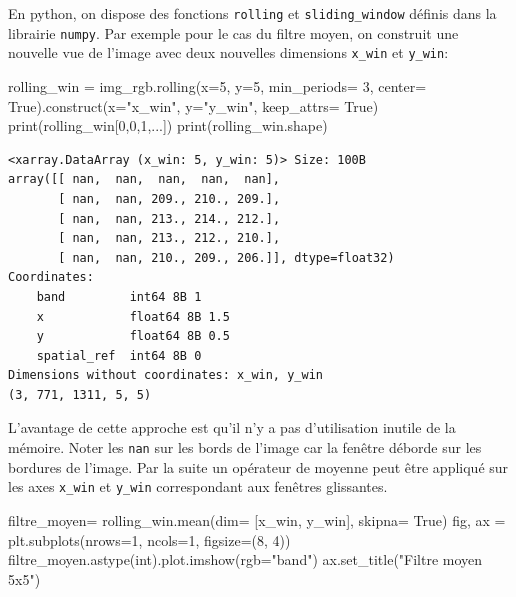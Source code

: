 \documentclass[
  french,
  11pt,
  letterpaper,
  open=any,
  twoside=false,
  french]{scrbook}
\newenvironment{Shaded}{\begin{snugshade}}{\end{snugshade}}
\newcommand{\BuiltInTok}[1]{\textcolor[rgb]{0.00,0.23,0.31}{#1}}
\newcommand{\DecValTok}[1]{\textcolor[rgb]{0.68,0.00,0.00}{#1}}
\newcommand{\NormalTok}[1]{\textcolor[rgb]{0.00,0.23,0.31}{#1}}
\newcommand{\OperatorTok}[1]{\textcolor[rgb]{0.37,0.37,0.37}{#1}}
\newcommand{\StringTok}[1]{\textcolor[rgb]{0.13,0.47,0.30}{#1}}
\newcommand{\VariableTok}[1]{\textcolor[rgb]{0.07,0.07,0.07}{#1}}
\begin{document}
En python, on dispose des fonctions \texttt{rolling} et
\texttt{sliding\_window} définis dans la librairie \texttt{numpy}. Par
exemple pour le cas du filtre moyen, on construit une nouvelle vue de
l'image avec deux nouvelles dimensions \texttt{x\_win} et
\texttt{y\_win}:

\begin{Shaded}
\begin{Highlighting}[]
\NormalTok{rolling\_win }\OperatorTok{=}\NormalTok{ img\_rgb.rolling(x}\OperatorTok{=}\DecValTok{5}\NormalTok{, y}\OperatorTok{=}\DecValTok{5}\NormalTok{,  min\_periods}\OperatorTok{=} \DecValTok{3}\NormalTok{, center}\OperatorTok{=} \VariableTok{True}\NormalTok{).construct(x}\OperatorTok{=}\StringTok{"x\_win"}\NormalTok{, y}\OperatorTok{=}\StringTok{"y\_win"}\NormalTok{, keep\_attrs}\OperatorTok{=} \VariableTok{True}\NormalTok{)}
\BuiltInTok{print}\NormalTok{(rolling\_win[}\DecValTok{0}\NormalTok{,}\DecValTok{0}\NormalTok{,}\DecValTok{1}\NormalTok{,...])}
\BuiltInTok{print}\NormalTok{(rolling\_win.shape)}
\end{Highlighting}
\end{Shaded}

\begin{verbatim}
<xarray.DataArray (x_win: 5, y_win: 5)> Size: 100B
array([[ nan,  nan,  nan,  nan,  nan],
       [ nan,  nan, 209., 210., 209.],
       [ nan,  nan, 213., 214., 212.],
       [ nan,  nan, 213., 212., 210.],
       [ nan,  nan, 210., 209., 206.]], dtype=float32)
Coordinates:
    band         int64 8B 1
    x            float64 8B 1.5
    y            float64 8B 0.5
    spatial_ref  int64 8B 0
Dimensions without coordinates: x_win, y_win
(3, 771, 1311, 5, 5)
\end{verbatim}

L'avantage de cette approche est qu'il n'y a pas d'utilisation inutile
de la mémoire. Noter les \texttt{nan} sur les bords de l'image car la
fenêtre déborde sur les bordures de l'image. Par la suite un opérateur
de moyenne peut être appliqué sur les axes \texttt{x\_win} et
\texttt{y\_win} correspondant aux fenêtres glissantes.

\begin{Shaded}
\begin{Highlighting}[]
\NormalTok{filtre\_moyen}\OperatorTok{=}\NormalTok{ rolling\_win.mean(dim}\OperatorTok{=}\NormalTok{ [}\StringTok{\textquotesingle{}x\_win\textquotesingle{}}\NormalTok{, }\StringTok{\textquotesingle{}y\_win\textquotesingle{}}\NormalTok{], skipna}\OperatorTok{=} \VariableTok{True}\NormalTok{)}
\NormalTok{fig, ax }\OperatorTok{=}\NormalTok{ plt.subplots(nrows}\OperatorTok{=}\DecValTok{1}\NormalTok{, ncols}\OperatorTok{=}\DecValTok{1}\NormalTok{, figsize}\OperatorTok{=}\NormalTok{(}\DecValTok{8}\NormalTok{, }\DecValTok{4}\NormalTok{))}
\NormalTok{filtre\_moyen.astype(}\StringTok{\textquotesingle{}int\textquotesingle{}}\NormalTok{).plot.imshow(rgb}\OperatorTok{=}\StringTok{"band"}\NormalTok{)}
\NormalTok{ax.set\_title(}\StringTok{"Filtre moyen 5x5"}\NormalTok{)}
\end{Highlighting}
\end{Shaded}
\end{document}
